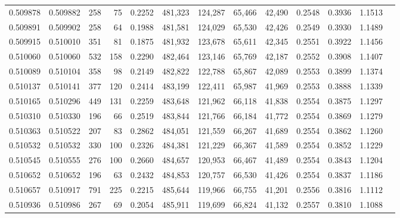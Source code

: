 \begin{tabular}{rrrrrrrrrrrrr}
0.509878 & 0.509882 &   258 &    75 &                                     0.2252 & 481,323 & 124,287 &  65,466 &  42,490 & 0.2548 & 0.3936 & 1.1513 \\
0.509891 & 0.509902 &   258 &    64 &                                     0.1988 & 481,581 & 124,029 &  65,530 &  42,426 & 0.2549 & 0.3930 & 1.1489 \\
0.509915 & 0.510010 &   351 &    81 &                                     0.1875 & 481,932 & 123,678 &  65,611 &  42,345 & 0.2551 & 0.3922 & 1.1456 \\
0.510060 & 0.510060 &   532 &   158 &                                     0.2290 & 482,464 & 123,146 &  65,769 &  42,187 & 0.2552 & 0.3908 & 1.1407 \\
0.510089 & 0.510104 &   358 &    98 &                                     0.2149 & 482,822 & 122,788 &  65,867 &  42,089 & 0.2553 & 0.3899 & 1.1374 \\
0.510137 & 0.510141 &   377 &   120 &                                     0.2414 & 483,199 & 122,411 &  65,987 &  41,969 & 0.2553 & 0.3888 & 1.1339 \\
0.510165 & 0.510296 &   449 &   131 &                                     0.2259 & 483,648 & 121,962 &  66,118 &  41,838 & 0.2554 & 0.3875 & 1.1297 \\
0.510310 & 0.510330 &   196 &    66 &                                     0.2519 & 483,844 & 121,766 &  66,184 &  41,772 & 0.2554 & 0.3869 & 1.1279 \\
0.510363 & 0.510522 &   207 &    83 &                                     0.2862 & 484,051 & 121,559 &  66,267 &  41,689 & 0.2554 & 0.3862 & 1.1260 \\
0.510532 & 0.510532 &   330 &   100 &                                     0.2326 & 484,381 & 121,229 &  66,367 &  41,589 & 0.2554 & 0.3852 & 1.1229 \\
0.510545 & 0.510555 &   276 &   100 &                                     0.2660 & 484,657 & 120,953 &  66,467 &  41,489 & 0.2554 & 0.3843 & 1.1204 \\
0.510652 & 0.510652 &   196 &    63 &                                     0.2432 & 484,853 & 120,757 &  66,530 &  41,426 & 0.2554 & 0.3837 & 1.1186 \\
0.510657 & 0.510917 &   791 &   225 &                                     0.2215 & 485,644 & 119,966 &  66,755 &  41,201 & 0.2556 & 0.3816 & 1.1112 \\
0.510936 & 0.510986 &   267 &    69 &                                     0.2054 & 485,911 & 119,699 &  66,824 &  41,132 & 0.2557 & 0.3810 & 1.1088 \\

\end{tabular}
